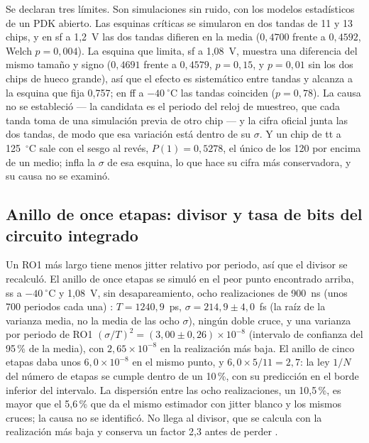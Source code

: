 Se declaran tres límites. Son simulaciones sin ruido, con los modelos
estadísticos de un \ac{PDK} abierto. Las esquinas críticas se simularon en
dos tandas de 11 y 13 chips, y en sf a 1,2~V las dos tandas difieren en
la media ($0{,}4700$ frente a $0{,}4592$, Welch $p = 0{,}004$). La
esquina que limita, sf a 1,08~V, muestra una diferencia del mismo tamaño
y signo ($0{,}4691$ frente a $0{,}4579$, $p = 0{,}15$, y $p = 0{,}01$ sin
los dos chips de hueco grande), así que el efecto es sistemático entre
tandas y alcanza a la esquina que fija 0,757; en ff a $-40~^\circ$C las
tandas coinciden ($p = 0{,}78$). La causa
no se estableció --- la candidata es el periodo del reloj de muestreo, que
cada tanda toma de una simulación previa de otro chip --- y la cifra
oficial junta las dos tandas, de modo que esa variación está dentro de su
$\sigma$. Y un chip de tt a 125~$^\circ$C sale con el sesgo al revés,
$P(1) = 0{,}5278$, el único de los 120 por encima de un medio; infla la
$\sigma$ de esa esquina, lo que hace su cifra más conservadora, y su causa
no se examinó.

\subsection{Anillo de once etapas: divisor y tasa de bits del circuito
integrado}
\label{sec:ihp_ring11}

Un RO1 más largo tiene menos jitter relativo por periodo, así que el
divisor se recalculó. El anillo de once etapas se simuló en el peor punto
encontrado arriba, ss a $-40~^\circ$C y 1,08~V, sin desapareamiento, ocho
realizaciones de 900~ns (unos 700 periodos cada una) \simu{}:
$T = 1240{,}9$~ps, $\sigma = 214{,}9 \pm 4{,}0$~fs (la raíz de la
varianza media, no la media de las ocho $\sigma$), ningún doble cruce, y
una varianza por periodo de RO1
$(\sigma/T)^2 = (3{,}00 \pm 0{,}26)\times10^{-8}$ (intervalo de confianza
del 95\,\% de la media), con $2{,}65\times10^{-8}$ en la realización más
baja. El anillo de cinco etapas daba unos $6{,}0\times10^{-8}$ en el mismo
punto, y $6{,}0 \times 5/11 = 2{,}7$: la ley $1/N$ del número de
etapas se cumple dentro de un 10\,\%, con su predicción en el borde
inferior del intervalo. La dispersión entre las ocho realizaciones, un 10,5\,\%, es mayor
que el 5,6\,\% que da el mismo estimador con jitter blanco y los mismos
cruces; la causa no se identificó. No llega al divisor, que se calcula con
la realización más baja y conserva un factor 2,3 antes de perder .

